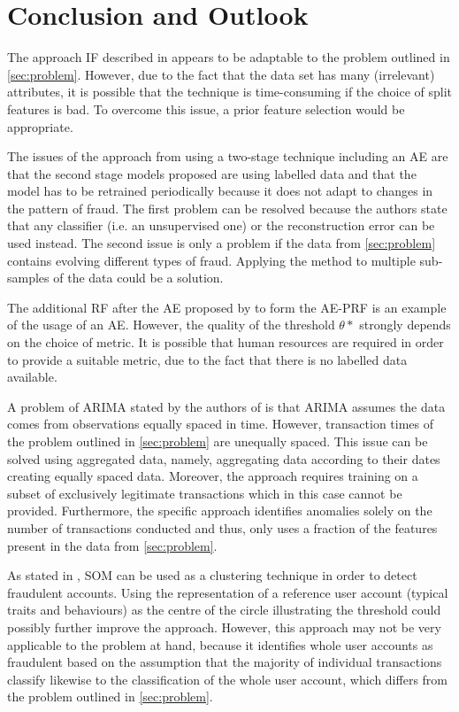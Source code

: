 \section{Conclusion and Outlook}

The approach \ac{IF} described in \cite{liu2008isolation} appears to be adaptable to the problem outlined in \autoref{sec:problem}. However, due to the fact that the data set has many (irrelevant) attributes, it is possible that the technique is time-consuming if the choice of split features is bad. To overcome this issue, a prior feature selection would be appropriate.

The issues of the approach from \cite{cf_AE} using a two-stage technique including an \ac{AE} are that the second stage models proposed are using labelled data and that the model has to be retrained periodically because it does not adapt to changes in the pattern of fraud. 
The first problem can be resolved because the authors state that any classifier (i.e. an unsupervised one) or the reconstruction error can be used instead. 
The second issue is only a problem if the data from \autoref{sec:problem} contains evolving different types of fraud. Applying the method to multiple sub-samples of the data could be a solution.

The additional \ac{RF} after the \ac{AE} proposed by \cite{AE_RF} to form the \ac{AE-PRF} is an example of the usage of an \ac{AE}. However, the quality of the threshold $\theta*$ strongly depends on the choice of metric. It is possible that human resources are required in order to provide a suitable metric, due to the fact that there is no labelled data available.

A problem of \ac{ARIMA} stated by the authors of \cite{fd_ARIMA} is that \ac{ARIMA} assumes the data comes from  observations equally spaced in time. 
However, transaction times of the problem outlined in \autoref{sec:problem} are unequally spaced. 
This issue can be solved using aggregated data, namely, aggregating data according to their dates creating equally spaced data.
Moreover, the approach requires training on a subset of exclusively legitimate transactions which in this case cannot be provided. 
Furthermore, the specific approach identifies anomalies solely on the number of transactions conducted and thus, only uses a fraction of the features present in the data from \autoref{sec:problem}.

As stated in \cite{fd_SOM}, \ac{SOM} can be used as a clustering technique in order to detect fraudulent accounts. Using the representation of a reference user account (typical traits and behaviours) as the centre of the circle illustrating the threshold could possibly further improve the approach.
However, this approach may not be very applicable to the problem at hand, because it identifies whole user accounts as fraudulent based on the assumption that the majority of individual transactions classify likewise to the classification of the whole user account, which differs from the problem outlined in \autoref{sec:problem}.

